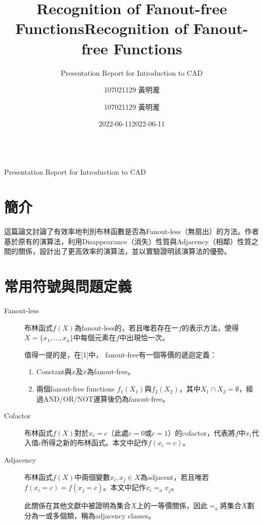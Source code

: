 \documentclass[
  12pt,
  paper=a4,
  ,captions=tableheading
]{scrartcl}
\title{Recognition of Fanout-free Functions}
\subtitle{Presentation Report for Introduction to CAD}
\author{107021129 黃明瀧}
\date{2022-06-11}
\title{Recognition of Fanout-free Functions}
\author{107021129 黃明瀧}
\date{2022-06-11}
\providecommand{\tightlist}{%
  \setlength{\itemsep}{0pt}\setlength{\parskip}{0pt}}
\begin{document}
\vspace*{-1\baselineskip}
{\LARGE \textbf{\thetitle}}\\[0.5\baselineskip]
{\color{gray}\Large Presentation Report for Introduction to
CAD\hfill{\large \theauthor}}
\vspace{-0.5\baselineskip}




\hypertarget{ux7c21ux4ecb}{%
\section{簡介}\label{ux7c21ux4ecb}}

這篇論文討論了有效率地判別布林函數是否為Fanout-less（無扇出）的方法。作者基於原有的演算法，利用Disappearance（消失）性質與Adjacency（相鄰）性質之間的關係，設計出了更高效率的演算法，並以實驗證明該演算法的優勢。

\hypertarget{ux5e38ux7528ux7b26ux865fux8207ux554fux984cux5b9aux7fa9}{%
\section{常用符號與問題定義}\label{ux5e38ux7528ux7b26ux865fux8207ux554fux984cux5b9aux7fa9}}

\begin{description}
\item[Fanout-less]
布林函式\(f(X)\)為fanout-less的，若且唯若存在一\(f\)的表示方法，使得\(X=\{x_1, \dots, x_n\}\)中每個元素在\(f\)中出現恰一次。

值得一提的是，在{[}1{]}中， fanout-free有一個等價的遞迴定義：

\begin{enumerate}
\def\labelenumi{\arabic{enumi}.}
\tightlist
\item
  Constant與\(x\)及\(\overline{x}\)為fanout-free。
\item
  兩個fanout-free functions
  \(f_1(X_1)\)與\(f_2(X_2)\)，其中\(X_1\cap X_2 = \emptyset\)，經過AND/OR/NOT運算後仍為fanout-free。
\end{enumerate}
\item[Cofactor]
布林函式\(f(X)\)對於\(x_i=c\)（此處\(c=0\)或\(c=1\)）的cofactor，代表將\(f\)中\(x_i\)代入值\(c\)所得之新的布林函式。本文中記作\(f(x_i=c)\)。
\item[Adjacency]
布林函式\(f(X)\)中兩個變數\(x_i,x_j\in X\)為adjacent，若且唯若\(f(x_i=c) = f(x_j=c)\)。本文中記作\(x_i =_a x_j\)。

此關係在其他文獻中被證明為集合\(X\)上的一等價關係，因此\(=_a\)將集合\(X\)劃分為一或多個類，稱為adjacency
classes。
\end{description}
\end{document}
